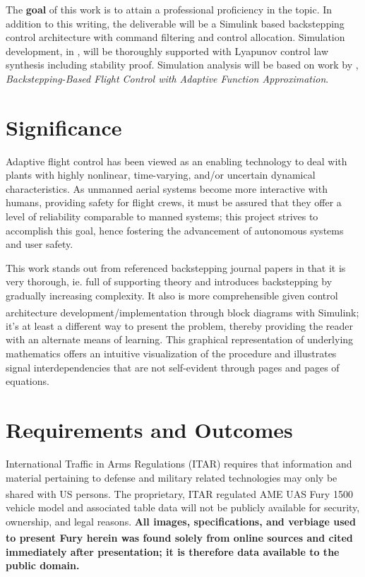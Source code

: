 \documentclass[12pt]{ucthesis}
\begin{document}
The \textbf{goal} of this work is to attain a professional proficiency in the topic. In addition to this writing, the deliverable will be a Simulink based backstepping control architecture with command filtering and control allocation. Simulation development, in , will be thoroughly supported with Lyapunov control law synthesis including stability proof. Simulation analysis will be based on work by \citet{Farrell2005}, \textit{Backstepping-Based Flight Control with Adaptive Function Approximation}.

\section{Significance}
\label{sec: significance}
Adaptive flight control has been viewed as an enabling technology to deal with plants with highly nonlinear, time-varying, and/or uncertain dynamical characteristics. As unmanned aerial systems  become more interactive with humans, providing safety for flight crews, it must be assured that they offer a level of reliability comparable to manned systems; this project strives to accomplish this goal, hence fostering the advancement of autonomous systems and user safety.

This work stands out from referenced backstepping journal papers in that it is very thorough, ie. full of supporting theory and introduces backstepping by gradually increasing complexity. It also is more comprehensible given control architecture development/implementation through block diagrams with Simulink\textsuperscript{\textregistered}; it's at least a different way to present the problem, thereby providing the reader with an alternate means of learning. This graphical representation of underlying mathematics offers an intuitive visualization of the procedure and illustrates signal interdependencies that are not self-evident through pages and pages of equations.

\section{Requirements and Outcomes}
\label{sec: reqandout}
International Traffic in Arms Regulations (ITAR) requires that information and material pertaining to defense and military related technologies may only be shared with US persons. The proprietary, ITAR regulated AME UAS Fury\textsuperscript{\textregistered} 1500 vehicle model and associated table data will not be publicly available for security, ownership, and legal reasons. \textbf{All images, specifications, and verbiage used to present Fury\textsuperscript{\textregistered} herein was found solely from online sources and cited immediately after presentation; it is therefore data available to the public domain.}
\end{document}
